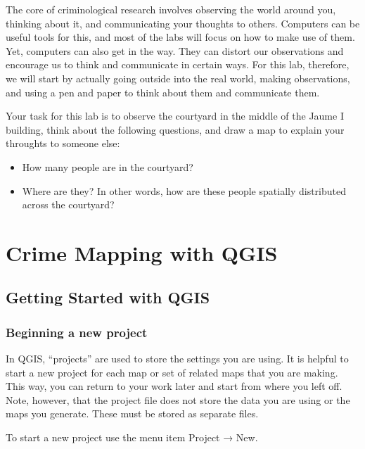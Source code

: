 \documentclass[]{book}
\providecommand{\tightlist}{%
  \setlength{\itemsep}{0pt}\setlength{\parskip}{0pt}}
\begin{document}
The core of criminological research involves observing the world around you, thinking about it, and communicating your thoughts to others. Computers can be useful tools for this, and most of the labs will focus on how to make use of them. Yet, computers can also get in the way. They can distort our observations and encourage us to think and communicate in certain ways. For this lab, therefore, we will start by actually going outside into the real world, making observations, and using a pen and paper to think about them and communicate them.

Your task for this lab is to observe the courtyard in the middle of the Jaume I building, think about the following questions, and draw a map to explain your throughts to someone else:

\begin{itemize}
\tightlist
\item
  How many people are in the courtyard?
\item
  Where are they? In other words, how are these people spatially distributed across the courtyard?
\end{itemize}

\hypertarget{part-crime-mapping-with-qgis}{%
\part{Crime Mapping with QGIS}\label{part-crime-mapping-with-qgis}}

\hypertarget{getting-started-with-qgis}{%
\chapter{Getting Started with QGIS}\label{getting-started-with-qgis}}

\hypertarget{beginning-a-new-project}{%
\section{Beginning a new project}\label{beginning-a-new-project}}

In QGIS, ``projects'' are used to store the settings you are using. It is helpful to start a new project for each map or set of related maps that you are making. This way, you can return to your work later and start from where you left off. Note, however, that the project file does not store the data you are using or the maps you generate. These must be stored as separate files.

To start a new project use the menu item Project → New.
\end{document}
